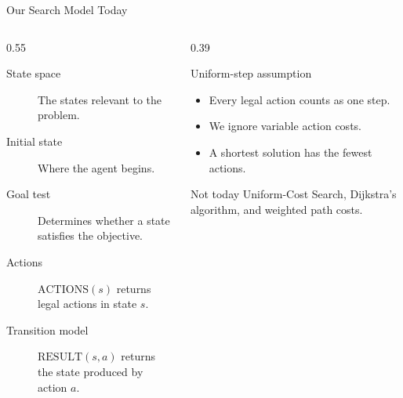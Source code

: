 \documentclass[aspectratio=169,10pt]{beamer}
\begin{document}
\begin{frame}[shrink=20]{Our Search Model Today}
  \begin{columns}[T,onlytextwidth]
    \begin{column}{0.55\textwidth}
      \begin{description}
        \item[State space] The states relevant to the problem.
        \item[Initial state] Where the agent begins.
        \item[Goal test] Determines whether a state satisfies the objective.
        \item[Actions] $\mathrm{ACTIONS}(s)$ returns legal actions in state $s$.
        \item[Transition model] $\mathrm{RESULT}(s,a)$ returns the state produced by action $a$.
      \end{description}
    \end{column}

    \begin{column}{0.39\textwidth}
      \begin{block}{Uniform-step assumption}
        \begin{itemize}
          \item Every legal action counts as one step.
          \item We ignore variable action costs.
          \item A shortest solution has the fewest actions.
        \end{itemize}
      \end{block}

      \begin{alertblock}{Not today}
        Uniform-Cost Search, Dijkstra's algorithm, and weighted path costs.
      \end{alertblock}
    \end{column}
  \end{columns}
\end{frame}
\end{document}
